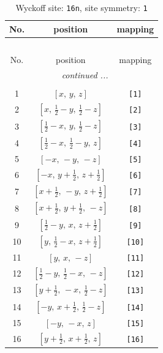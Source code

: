 \documentclass[fleqn,8pt]{jsarticle}
\begin{document}
\begin{longtable}{ccc}
\caption{Wyckoff site: {\tt 16n}, site symmetry: {\tt 1}}
 \\
 \hline \hline
No. & position & mapping \\ \hline \endfirsthead

\multicolumn{2}{l}{\tablename\ \thetable{}} \\
 \hline \hline
No. & position & mapping \\ \hline \endhead

 \hline \hline
\multicolumn{2}{r}{\footnotesize\it continued ...} \\ \endfoot

 \hline \hline
\multicolumn{2}{r}{} \\ \endlastfoot

1 & $\left[ x,\, y,\, z \right]$ & {\tt [1]} \\ \hline
2 & $\left[ x,\, \frac{1}{2} - y,\, \frac{1}{2} - z \right]$ & {\tt [2]} \\ \hline
3 & $\left[ \frac{1}{2} - x,\, y,\, \frac{1}{2} - z \right]$ & {\tt [3]} \\ \hline
4 & $\left[ \frac{1}{2} - x,\, \frac{1}{2} - y,\, z \right]$ & {\tt [4]} \\ \hline
5 & $\left[ - x,\, - y,\, - z \right]$ & {\tt [5]} \\ \hline
6 & $\left[ - x,\, y + \frac{1}{2},\, z + \frac{1}{2} \right]$ & {\tt [6]} \\ \hline
7 & $\left[ x + \frac{1}{2},\, - y,\, z + \frac{1}{2} \right]$ & {\tt [7]} \\ \hline
8 & $\left[ x + \frac{1}{2},\, y + \frac{1}{2},\, - z \right]$ & {\tt [8]} \\ \hline
9 & $\left[ \frac{1}{2} - y,\, x,\, z + \frac{1}{2} \right]$ & {\tt [9]} \\ \hline
10 & $\left[ y,\, \frac{1}{2} - x,\, z + \frac{1}{2} \right]$ & {\tt [10]} \\ \hline
11 & $\left[ y,\, x,\, - z \right]$ & {\tt [11]} \\ \hline
12 & $\left[ \frac{1}{2} - y,\, \frac{1}{2} - x,\, - z \right]$ & {\tt [12]} \\ \hline
13 & $\left[ y + \frac{1}{2},\, - x,\, \frac{1}{2} - z \right]$ & {\tt [13]} \\ \hline
14 & $\left[ - y,\, x + \frac{1}{2},\, \frac{1}{2} - z \right]$ & {\tt [14]} \\ \hline
15 & $\left[ - y,\, - x,\, z \right]$ & {\tt [15]} \\ \hline
16 & $\left[ y + \frac{1}{2},\, x + \frac{1}{2},\, z \right]$ & {\tt [16]} \\
\end{longtable}
\end{document}
